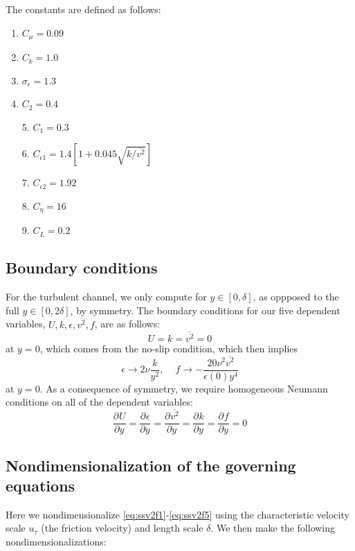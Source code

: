 \documentclass[a4paper,11pt]{article}
\newcommand{\pderiv}[3][]{%
  \ensuremath{\frac{\partial^{#1} {#2}}{\partial {#3}^{#1}}}}
\newcommand{\ep}{\epsilon}
\begin{document}
The constants are defined as follows: 
\begin{multicols}{2}
\begin{enumerate}
	\item $C_\mu = 0.09$
        \item $C_k = 1.0$
	\item $\sigma_\ep = 1.3$
	\item $C_2 = 0.4$	
\end{enumerate}
\columnbreak 

\begin{itemize}
	\item[5.] $C_1 = 0.3$
	\item[6.] $C_{\ep 1} = 1.4[1 + 0.045 \sqrt{k/\overline{v^2}}]$
	\item[7.] $C_{\ep 2} = 1.92$  
	\item[8.] $C_\eta = 16$
	\item[9.] $C_L = 0.2$
\end{itemize}
\end{multicols}

\subsection{Boundary conditions}
For the turbulent channel, we only compute for $y \in [0,\delta] $, as oppposed to the full $y \in [0,2\delta]$, by symmetry. The boundary conditions for our five dependent variables, $U, k, \ep, \overline{v^2}, f$, are as follows: 
\[
U = k = \overline{v^2} = 0 
\]
at $y = 0$, which comes from the no-slip condition, which then implies 
\[
\epsilon \to 2\nu \frac{k}{y^2}, \,\,\,\,\,\,\, f \to -\frac{20 \nu^2 \overline{v^2} }{\ep(0) y^4}
\]
at $y = 0$. As a consequence of symmetry, we require homogeneous Neumann conditions on all of the dependent variables: 
\[
\pderiv{U}{y}= \pderiv{\ep}{y} = \pderiv{\overline{v^2}}{y} = \pderiv{k}{y} = \pderiv{f}{y} = 0
\] 

\subsection{Nondimensionalization of the governing equations}
Here we nondimensionalize \eqref{eq:ssv2f1}-\eqref{eq:ssv2f5} using the characteristic velocity scale $u_{\tau}$ (the friction velocity) and length scale $\delta$. We then make the following nondimensionalizations:
\end{document}
